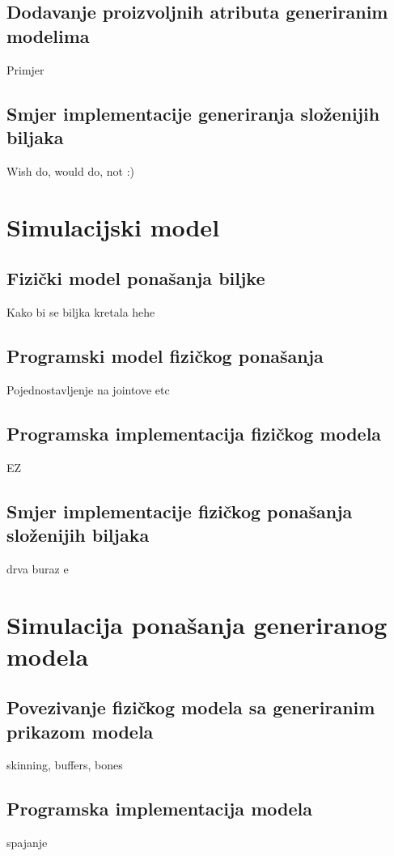 \documentclass[times, utf8, diplomski]{fer}
\begin{document}
\section{Dodavanje proizvoljnih atributa generiranim modelima}
Primjer

\section{Smjer implementacije generiranja složenijih biljaka}
Wish do, would do, not :)

\chapter{Simulacijski model}
\section{Fizički model ponašanja biljke}
Kako bi se biljka kretala hehe

\section{Programski model fizičkog ponašanja}
Pojednostavljenje na jointove etc

\section{Programska implementacija fizičkog modela}
EZ

\section{Smjer implementacije fizičkog ponašanja složenijih biljaka}
drva buraz e

\chapter{Simulacija ponašanja generiranog modela}
\section{Povezivanje fizičkog modela sa generiranim prikazom modela}
skinning, buffers, bones

\section{Programska implementacija modela}
spajanje
\end{document}
